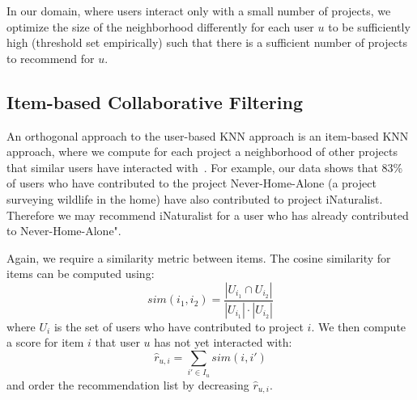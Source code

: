 \documentclass[letterpaper]{article} %
\begin{document}
In our domain, where users interact only with a small number of projects, we optimize the size of the neighborhood differently for each user $u$ to be sufficiently high (threshold set empirically) such that there is a sufficient number of projects to recommend for $u$.
 

\subsection{Item-based Collaborative Filtering}

An orthogonal approach to the user-based KNN approach is an item-based KNN approach, where we compute for each project a neighborhood of other projects that similar users have interacted with~\cite{schafer2007collaborative}. For example,  our data shows that 83\% of users who have contributed to the project Never-Home-Alone (a project surveying 
wildlife in the home) have  also
 contributed to project iNaturalist. Therefore we may  recommend  iNaturalist for a user who has already contributed to Never-Home-Alone".

Again, we require a similarity metric between items. The cosine similarity for items can be computed using:
\begin{equation}
    sim(i_1,i_2)= \frac{|U_{i_1} \cap U_{i_2}|}{|U_{i_1}| \cdot |U_{i_2}|}
\end{equation}
where $U_i$ is the set of users who have contributed to project $i$.
We then compute a score for item $i$ that user $u$ has not yet interacted with:
\begin{equation}
    \hat{r}_{u,i}=\sum_{i' \in I_u} sim(i,i')
\end{equation}
and order the recommendation list by decreasing $\hat{r}_{u,i}$.



\end{document}
